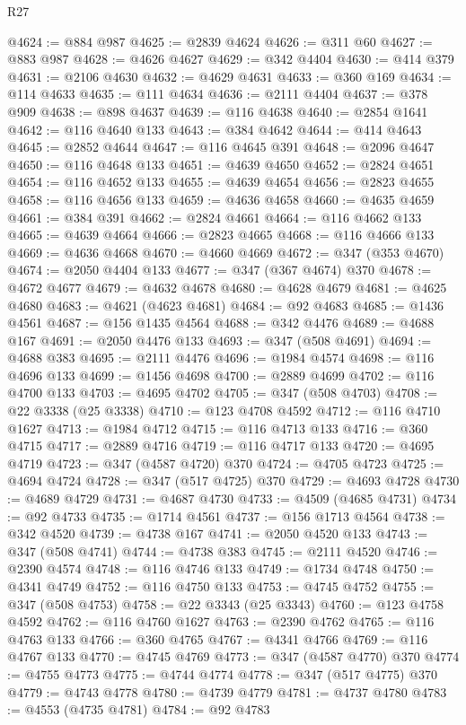 \begin{lexlean}{R27}
\begin{coremodule}
@4624 := @884 @987
@4625 := @2839 @4624
@4626 := @311 @60
@4627 := @883 @987
@4628 := @4626 @4627
@4629 := @342 @4404
@4630 := @414 @379
@4631 := @2106 @4630
@4632 := @4629 @4631
@4633 := @360 @169
@4634 := @114 @4633
@4635 := @111 @4634
@4636 := @2111 @4404
@4637 := @378 @909
@4638 := @898 @4637
@4639 := @116 @4638
@4640 := @2854 @1641
@4642 := @116 @4640 @133
@4643 := @384 @4642
@4644 := @414 @4643
@4645 := @2852 @4644
@4647 := @116 @4645 @391
@4648 := @2096 @4647
@4650 := @116 @4648 @133
@4651 := @4639 @4650
@4652 := @2824 @4651
@4654 := @116 @4652 @133
@4655 := @4639 @4654
@4656 := @2823 @4655
@4658 := @116 @4656 @133
@4659 := @4636 @4658
@4660 := @4635 @4659
@4661 := @384 @391
@4662 := @2824 @4661
@4664 := @116 @4662 @133
@4665 := @4639 @4664
@4666 := @2823 @4665
@4668 := @116 @4666 @133
@4669 := @4636 @4668
@4670 := @4660 @4669
@4672 := @347 (@353 @4670)
@4674 := @2050 @4404 @133
@4677 := @347 (@367 @4674) @370
@4678 := @4672 @4677
@4679 := @4632 @4678
@4680 := @4628 @4679
@4681 := @4625 @4680
@4683 := @4621 (@4623 @4681)
@4684 := @92 @4683
@4685 := @1436 @4561
@4687 := @156 @1435 @4564
@4688 := @342 @4476
@4689 := @4688 @167
@4691 := @2050 @4476 @133
@4693 := @347 (@508 @4691)
@4694 := @4688 @383
@4695 := @2111 @4476
@4696 := @1984 @4574
@4698 := @116 @4696 @133
@4699 := @1456 @4698
@4700 := @2889 @4699
@4702 := @116 @4700 @133
@4703 := @4695 @4702
@4705 := @347 (@508 @4703)
@4708 := @22 @3338 (@25 @3338)
@4710 := @123 @4708 @4592
@4712 := @116 @4710 @1627
@4713 := @1984 @4712
@4715 := @116 @4713 @133
@4716 := @360 @4715
@4717 := @2889 @4716
@4719 := @116 @4717 @133
@4720 := @4695 @4719
@4723 := @347 (@4587 @4720) @370
@4724 := @4705 @4723
@4725 := @4694 @4724
@4728 := @347 (@517 @4725) @370
@4729 := @4693 @4728
@4730 := @4689 @4729
@4731 := @4687 @4730
@4733 := @4509 (@4685 @4731)
@4734 := @92 @4733
@4735 := @1714 @4561
@4737 := @156 @1713 @4564
@4738 := @342 @4520
@4739 := @4738 @167
@4741 := @2050 @4520 @133
@4743 := @347 (@508 @4741)
@4744 := @4738 @383
@4745 := @2111 @4520
@4746 := @2390 @4574
@4748 := @116 @4746 @133
@4749 := @1734 @4748
@4750 := @4341 @4749
@4752 := @116 @4750 @133
@4753 := @4745 @4752
@4755 := @347 (@508 @4753)
@4758 := @22 @3343 (@25 @3343)
@4760 := @123 @4758 @4592
@4762 := @116 @4760 @1627
@4763 := @2390 @4762
@4765 := @116 @4763 @133
@4766 := @360 @4765
@4767 := @4341 @4766
@4769 := @116 @4767 @133
@4770 := @4745 @4769
@4773 := @347 (@4587 @4770) @370
@4774 := @4755 @4773
@4775 := @4744 @4774
@4778 := @347 (@517 @4775) @370
@4779 := @4743 @4778
@4780 := @4739 @4779
@4781 := @4737 @4780
@4783 := @4553 (@4735 @4781)
@4784 := @92 @4783

\end{coremodule}
\end{lexlean}
